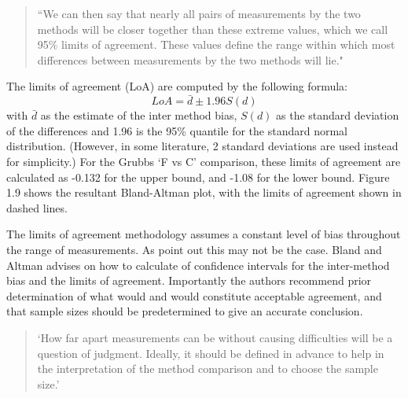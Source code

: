 \documentclass[12pt, a4paper]{report}
\begin{document}
	\begin{quote} ``We can then say that nearly all pairs
		of measurements by the two methods will be closer together than
		these extreme values, which we call 95\% limits of agreement.
		These values define the range within which most differences
		between measurements by the two methods will lie."
	\end{quote}
	
	The limits of agreement (LoA) are computed by the following
	formula:
	\begin{equation}
	LoA = \bar{d} \pm 1.96 S(d)
	\end{equation}
	with $\bar{d}$ as the estimate of the inter method bias, $S(d)$ as
	the standard deviation of the differences and 1.96 is the 95\%
	quantile for the standard normal distribution. (However, in some
	literature, 2 standard deviations are used instead for
	simplicity.) For the Grubbs `F vs C' comparison, these limits of
	agreement are calculated as -0.132 for the upper bound, and -1.08
	for the lower bound. Figure 1.9 shows the resultant Bland-Altman
	plot, with the limits of agreement shown in dashed lines.
	
	
	The limits of agreement methodology assumes a constant level of
	bias throughout the range of measurements. As \citet*{BA86} point
	out this may not be the case. Bland and Altman advises on how to
	calculate of confidence intervals for the inter-method bias and
	the limits of agreement. Importantly the authors recommend prior
	determination of what would and would constitute acceptable
	agreement, and that sample sizes should be predetermined to give
	an accurate conclusion.
	
	\begin{quote}
		`How far apart measurements can be without causing difficulties
		will be a question of judgment. Ideally, it should be defined in
		advance to help in the interpretation of the method comparison and
		to choose the sample size.'\citep{BA86}
	\end{quote}
	
\end{document}
